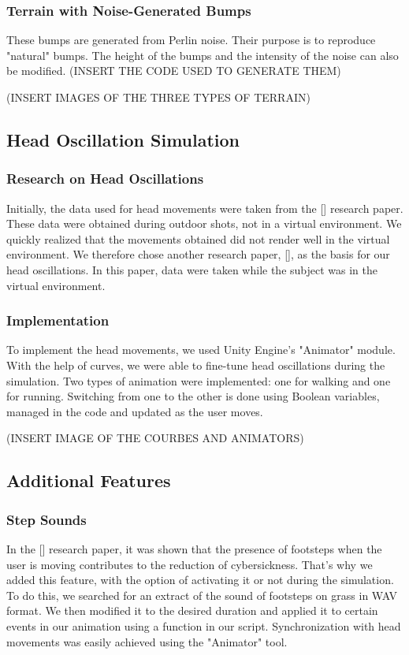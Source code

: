 \documentclass[american]{acmtog} %
\begin{document}
\subsubsection{Terrain with Noise-Generated Bumps}
These bumps are generated from Perlin noise. Their purpose is to reproduce "natural" bumps. The height of the bumps and the intensity of the noise can also be modified. (INSERT THE CODE USED TO GENERATE THEM)

(INSERT IMAGES OF THE THREE TYPES OF TERRAIN)

\subsection{Head Oscillation Simulation}
\subsubsection{Research on Head Oscillations}
Initially, the data used for head movements were taken from the [\cite{translational_motion}] research paper. These data were obtained during outdoor shots, not in a virtual environment. We quickly realized that the movements obtained did not render well in the virtual environment. We therefore chose another research paper, [\cite{trigger_walking}], as the basis for our head oscillations. In this paper, data were taken while the subject was in the virtual environment.

\subsubsection{Implementation}
To implement the head movements, we used Unity Engine's "Animator" module. With the help of curves, we were able to fine-tune head oscillations during the simulation. Two types of animation were implemented: one for walking and one for running. Switching from one to the other is done using Boolean variables, managed in the code and updated as the user moves.

(INSERT IMAGE OF THE COURBES AND ANIMATORS)

\subsection{Additional Features}
\subsubsection{Step Sounds}
In the [\cite{walking_vibe}] research paper, it was shown that the presence of footsteps when the user is moving contributes to the reduction of cybersickness. That's why we added this feature, with the option of activating it or not during the simulation. To do this, we searched for an extract of the sound of footsteps on grass in WAV format. We then modified it to the desired duration and applied it to certain events in our animation using a function in our script. Synchronization with head movements was easily achieved using the "Animator" tool.
\end{document}
